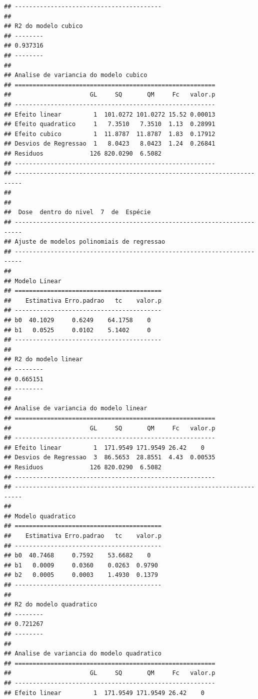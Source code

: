 \documentclass[
]{article}
\begin{document}
\begin{verbatim}
## -----------------------------------------
## 
## R2 do modelo cubico
## --------
## 0.937316
## --------
## 
## Analise de variancia do modelo cubico
## ========================================================
##                      GL     SQ       QM     Fc   valor.p
## --------------------------------------------------------
## Efeito linear         1  101.0272 101.0272 15.52 0.00013
## Efeito quadratico     1   7.3510   7.3510  1.13  0.28991
## Efeito cubico         1  11.8787  11.8787  1.83  0.17912
## Desvios de Regressao  1   8.0423   8.0423  1.24  0.26841
## Residuos             126 820.0290  6.5082               
## --------------------------------------------------------
## ------------------------------------------------------------------------
## 
## 
##  Dose  dentro do nivel  7  de  Espécie 
## ------------------------------------------------------------------------
## Ajuste de modelos polinomiais de regressao
## ------------------------------------------------------------------------
## 
## Modelo Linear
## =========================================
##    Estimativa Erro.padrao   tc    valor.p
## -----------------------------------------
## b0  40.1029     0.6249    64.1758    0   
## b1   0.0525     0.0102    5.1402     0   
## -----------------------------------------
## 
## R2 do modelo linear
## --------
## 0.665151
## --------
## 
## Analise de variancia do modelo linear
## ========================================================
##                      GL     SQ       QM     Fc   valor.p
## --------------------------------------------------------
## Efeito linear         1  171.9549 171.9549 26.42    0   
## Desvios de Regressao  3  86.5653  28.8551  4.43  0.00535
## Residuos             126 820.0290  6.5082               
## --------------------------------------------------------
## ------------------------------------------------------------------------
## 
## Modelo quadratico
## =========================================
##    Estimativa Erro.padrao   tc    valor.p
## -----------------------------------------
## b0  40.7468     0.7592    53.6682    0   
## b1   0.0009     0.0360    0.0263  0.9790 
## b2   0.0005     0.0003    1.4930  0.1379 
## -----------------------------------------
## 
## R2 do modelo quadratico
## --------
## 0.721267
## --------
## 
## Analise de variancia do modelo quadratico
## ========================================================
##                      GL     SQ       QM     Fc   valor.p
## --------------------------------------------------------
## Efeito linear         1  171.9549 171.9549 26.42    0   

\end{verbatim}
\end{document}
